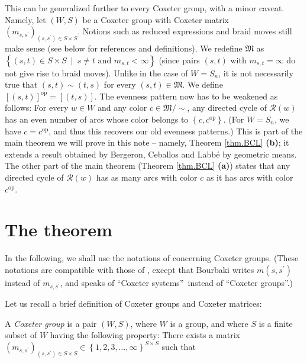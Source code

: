 \documentclass
[numbers=enddot,12pt,final,onecolumn,notitlepage,abstracton]{scrartcl}%
\theoremstyle{definition}
\begin{document}
This can be generalized further to every Coxeter group, with a minor caveat.
Namely, let $\left(  W,S\right)  $ be a Coxeter group with Coxeter matrix
$\left(  m_{s,s^{\prime}}\right)  _{\left(  s,s^{\prime}\right)  \in S\times
S}$. Notions such as reduced expressions and braid moves still make sense (see
below for references and definitions). We redefine $\mathfrak{M}$ as $\left\{
\left(  s,t\right)  \in S\times S\ \mid\ s\neq t\text{ and }m_{s,t}%
<\infty\right\}  $ (since pairs $\left(  s,t\right)  $ with $m_{s,t}=\infty$
do not give rise to braid moves). Unlike in the case of $W=S_{n}$, it is not
necessarily true that $\left(  s,t\right)  \sim\left(  t,s\right)  $ for every
$\left(  s,t\right)  \in\mathfrak{M}$. We define $\left[  \left(  s,t\right)
\right]  ^{\operatorname*{op}}=\left[  \left(  t,s\right)  \right]  $. The
evenness pattern now has to be weakened as follows: For every $w\in W$ and any
color $c\in\mathfrak{M}/\sim$, any directed cycle of $\mathcal{R}\left(
w\right)  $ has an even number of arcs whose color belongs to $\left\{
c,c^{\operatorname*{op}}\right\}  $. (For $W=S_{n}$, we have
$c=c^{\operatorname*{op}}$, and thus this recovers our old evenness patterns.)
This is part of the main theorem we will prove in this note -- namely, Theorem
\ref{thm.BCL} \textbf{(b)}; it extends a result \cite[Theorem 3.1]{BCL}
obtained by Bergeron, Ceballos and Labb\'{e} by geometric means. The other
part of the main theorem (Theorem \ref{thm.BCL} \textbf{(a)}) states that any
directed cycle of $\mathcal{R}\left(  w\right)  $ has as many arcs with color
$c$ as it has arcs with color $c^{\operatorname*{op}}$.


\section{The theorem}

In the following, we shall use the notations of \cite[\S 1]{Lusztig-Hecke}
concerning Coxeter groups. (These notations are compatible with those of
\cite[Chapter 4]{Bourbaki4-6}, except that Bourbaki writes $m\left(
s,s^{\prime}\right)  $ instead of $m_{s,s^{\prime}}$, and speaks of
\textquotedblleft Coxeter systems\textquotedblright\ instead of
\textquotedblleft Coxeter groups\textquotedblright.)

Let us recall a brief definition of Coxeter groups and Coxeter matrices:

A \emph{Coxeter group} is a pair $\left(  W,S\right)  $, where $W$ is a group,
and where $S$ is a finite subset of $W$ having the following property: There
exists a matrix $\left(  m_{s,s^{\prime}}\right)  _{\left(  s,s^{\prime
}\right)  \in S\times S}\in\left\{  1,2,3,\ldots,\infty\right\}  ^{S\times S}$
such that
\end{document}
